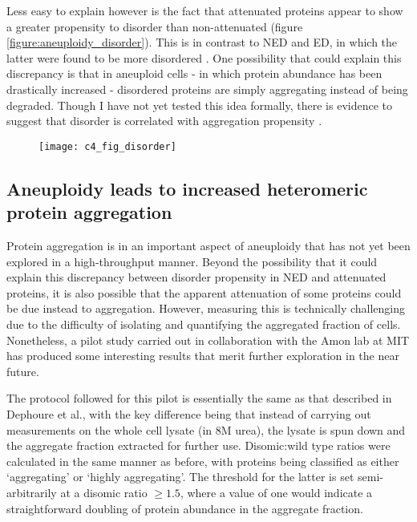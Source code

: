 \documentclass[a4paper,11pt,twoside,openright]{scrbook}
\begin{document}
Less easy to explain however is the fact that attenuated proteins appear to show
a greater propensity to disorder than non-attenuated (figure
\ref{figure:aneuploidy_disorder}). This is in contrast to NED and ED, in which
the latter were found to be more disordered \cite{McShane2016}. One possibility
that could explain this discrepancy is that in aneuploid cells - in which
protein abundance has been drastically increased - disordered proteins are
simply aggregating instead of being degraded. Though I have not yet tested this
idea formally, there is evidence to suggest that disorder is correlated with
aggregation propensity \cite{Carvalho2013}.

\begin{figure}[h] 
{\texttt{[image: c4\_fig\_disorder]}} \end{figure}

\subsection{Aneuploidy leads to increased heteromeric protein aggregation}
Protein aggregation is in an important aspect of aneuploidy that has not yet
been explored in a high-throughput manner. Beyond the possibility that it could
explain this discrepancy between disorder propensity in NED and attenuated
proteins, it is also possible that the apparent attenuation of some proteins
could be due instead to aggregation. However, measuring this is technically
challenging due to the difficulty of isolating and quantifying the aggregated
fraction of cells. Nonetheless, a pilot study carried out in collaboration with
the Amon lab at MIT has produced some interesting results that merit further
exploration in the near future.

The protocol followed for this pilot is essentially the same as that described
in Dephoure et al., with the key difference being that instead of carrying out
measurements on the whole cell lysate (in 8M urea), the lysate is spun down and
the aggregate fraction extracted for further use. Disomic:wild type ratios were
calculated in the same manner as before, with proteins being classified as
either `aggregating' or `highly aggregating'. The threshold for the latter is
set semi-arbitrarily at a disomic ratio $\geq 1.5$, where a value of one would
indicate a straightforward doubling of protein abundance in the aggregate
fraction.
\end{document}
